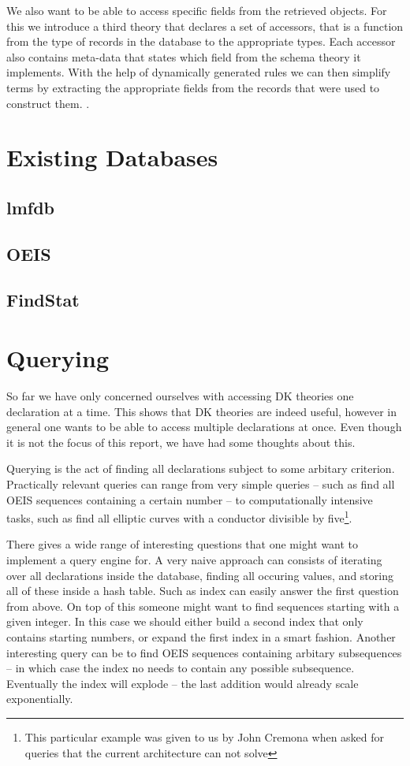 \documentclass{deliverablereport}
\begin{document}
We also want to be able to access specific fields from the retrieved objects. For this we introduce a third theory that declares a set of accessors, that is a function from the type of records in the database to the appropriate types. Each accessor also contains meta-data that states which field from the schema theory it implements. With the help of dynamically generated rules we can then simplify terms by extracting the appropriate fields from the records that were used to construct them. .


\section{Existing Databases}\label{sec:lmfdb}

\subsection{lmfdb}
\subsection{OEIS}
\subsection{FindStat}

\section{Querying}

So far we have only concerned ourselves with accessing DK theories one declaration at a time. This shows that DK theories are indeed useful, however in general one wants to be able to access multiple declarations at once. Even though it is not the focus of this report, we have had some thoughts about this.

Querying is the act of finding all declarations subject to some arbitary criterion. Practically relevant queries can range from very simple queries -- such as find all OEIS sequences containing a certain number -- to computationally intensive tasks, such as find all elliptic curves with a conductor divisible by five\footnote{This particular example was given to us by John Cremona when asked for queries that the current architecture can not solve}.

There gives a wide range of interesting questions that one might want to implement a query engine for. A very naive approach can consists of iterating over all declarations inside the database, finding all occuring values, and storing all of these inside a hash table. Such as index can easily answer the first question from above. On top of this someone might want to find sequences starting with a given integer. In this case we should either build a second index that only contains starting numbers, or expand the first index in a smart fashion. Another interesting query can be to find OEIS sequences containing arbitary subsequences -- in which case the index no needs to contain any possible subsequence. Eventually the index will explode -- the last addition would already scale exponentially.
\end{document}
